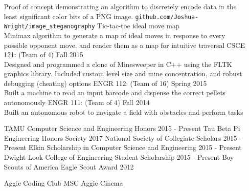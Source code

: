 \documentclass[12pt]{article}
\begin{document}
\begin{flushleft}
\begin{outline}[compactitem]
  \1 Proof of concept demonstrating an algorithm to discretely encode data in the least significant color bits of a PNG image.
    \verb|github.com/Joshua-Wright/image_steganography|
  \1 Tic-tac-toe ideal move map
    \\ Minimax algorithm to generate a map of ideal moves in response to every possible opponent move, and render them as a map for intuitive traversal
  \1 CSCE 121:  (Team of 4) \hfill Fall 2015 
    \\ Designed and programmed a clone of Minesweeper in C++ using the FLTK graphics library. Included custom level size and mine concentration, and robust debugging (cheating) options
  \1 ENGR 112: (Team of 16) \hfill Spring 2015
    \\ Built a machine to read an input barcode and dispense the correct pellets autonomously 
  \1 ENGR 111: (Team of 4) \hfill Fall 2014
    \\ Built an autonomous robot to navigate a field with obstacles and perform tasks

  \1 TAMU Computer Science and Engineering Honors           \hfill 2015 - Present
  \1 Tau Beta Pi Engineering Honors Society                 \hfill 2017
  \1 National Society of Collegiate Scholars                \hfill 2015 - Present
  \1 Elkin Scholarship in Computer Science and Engineering  \hfill 2015 - Present
  \1 Dwight Look College of Engineering Student Scholarship \hfill 2015 - Present
  \1 Boy Scouts of America Eagle Scout Award                \hfill 2012
  \hfill %

  \1 Aggie Coding Club
  \1 MSC Aggie Cinema



\end{outline}
\end{flushleft}
\end{document}
